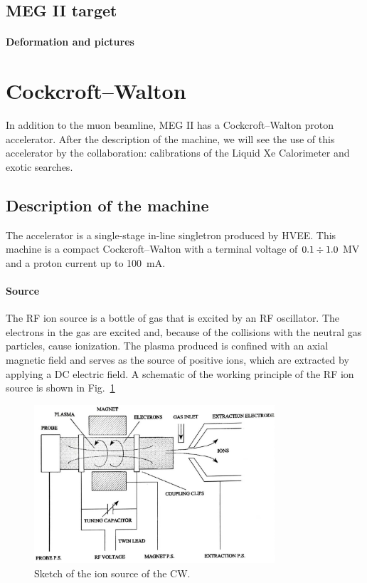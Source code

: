 \begin{refsection}
    \subsection{MEG II target}
        \paragraph{Deformation and pictures}

\section{Cockcroft–Walton}
    \label{sec:cw:calib}
    In addition to the muon beamline, MEG II has a Cockcroft–Walton proton accelerator. 
    After the description of the machine, we will see the use of this accelerator by the collaboration: calibrations of the Liquid Xe Calorimeter and exotic searches. 

    \subsection{Description of the machine}
        \label{sec:cw:machine}
        The accelerator is a single-stage in-line singletron produced by HVEE. 
        This machine is a compact Cockcroft–Walton with a terminal voltage of $0.1\divisionsymbol1.0$ MV and a proton current up to \SI{100}{mA}.
        
        \paragraph{Source} The RF ion source is a bottle of gas that is excited by an RF oscillator. 
        The electrons in the gas are excited and, because of the collisions with the neutral gas particles, cause ionization.
        The plasma produced is confined with an axial magnetic field and serves as the source of positive ions, which are extracted by applying a DC electric field.
        A schematic of the working principle of the RF ion source is shown in Fig.~\ref{fig:CW:sketch:ionsource}

       \begin{figure}
            \centering
            \includegraphics[width=0.8\textwidth]{Figures/MEG/CW/cw_ionsource.jpeg}
            \caption{Sketch of the ion source of the CW.}
            \label{fig:CW:sketch:ionsource}
        \end{figure}
        

\end{refsection}
